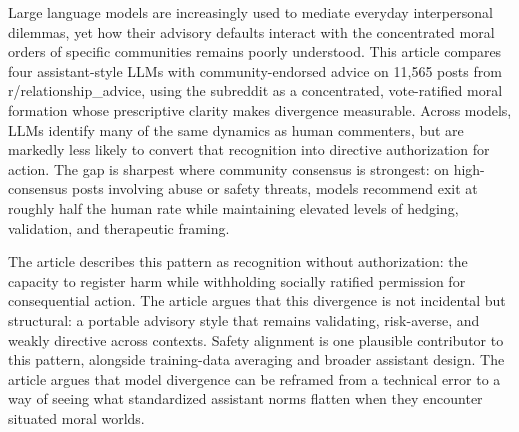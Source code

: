 Large language models are increasingly used to mediate everyday interpersonal dilemmas, yet how their advisory defaults interact with the concentrated moral orders of specific communities remains poorly understood. This article compares four assistant-style LLMs with community-endorsed advice on 11,565 posts from r/relationship\_advice, using the subreddit as a concentrated, vote-ratified moral formation whose prescriptive clarity makes divergence measurable. Across models, LLMs identify many of the same dynamics as human commenters, but are markedly less likely to convert that recognition into directive authorization for action. The gap is sharpest where community consensus is strongest: on high-consensus posts involving abuse or safety threats, models recommend exit at roughly half the human rate while maintaining elevated levels of hedging, validation, and therapeutic framing. 

The article describes this pattern as recognition without authorization: the capacity to register harm while withholding socially ratified permission for consequential action. The article argues that this divergence is not incidental but structural: a portable advisory style that remains validating, risk-averse, and weakly directive across contexts. Safety alignment is one plausible contributor to this pattern, alongside training-data averaging and broader assistant design. The article argues that model divergence can be reframed from a technical error to a way of seeing what standardized assistant norms flatten when they encounter situated moral worlds.